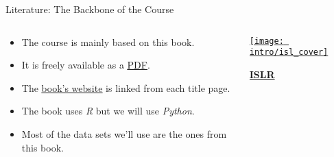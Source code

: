 \documentclass[mathserif, aspectratio=169]{beamer}
\begin{document}
\begin{frame}{Literature: The Backbone of the Course}
	\begin{columns}
		\begin{column}{0.6\textwidth}
			\begin{itemize}
				\item The course is mainly based on this book.
				\item It is freely available as a
					\href{http://faculty.marshall.usc.edu/gareth-james/ISL/ISLR\%20Seventh\%20Printing.pdf}{\blue\underline{PDF}}.
				\item The \href{www.statlearning.com}{\blue\underline{book's website}} is linked from each title page.
				\item The book uses \emph{R} but we will use \emph{Python}. 
				\item Most of the data sets we'll use are the ones from this book.
			\end{itemize}
		\end{column}
		\begin{column}{0.4\textwidth}
			\begin{center}
				\href{www.statlearning.com}{\texttt{[image: intro/isl\_cover]}}
			\end{center}
			\begin{center}
				\href{www.statlearning.com}{\bfseries\blue ISLR}
			\end{center}
		\end{column}
	\end{columns}
\end{frame}
\end{document}
